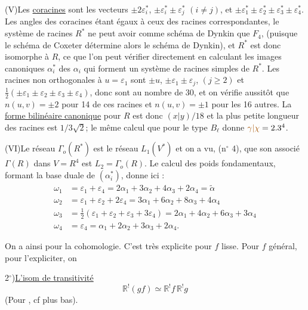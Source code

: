 (V)\quad Les \uline{coracines} sont les vecteurs $\pm2\varepsilon_i^*$, $\pm\varepsilon_i^*\pm\varepsilon_j^*$ $(i\ne j)$, et
$\pm\varepsilon_1^*\pm\varepsilon_2^*\pm\varepsilon_3^*\pm\varepsilon_4^*$. Les angles des coracines étant égaux à ceux des racines
correspondantes, le système de racines $R^*$ ne peut avoir comme schéma de Dynkin
que $F_4$, (puisque le schéma de Coxeter détermine alors le schéma de Dynkin), et $R^*$
est donc isomorphe à $R$, ce que l'on peut vérifier directement en calculant les
images canoniques $\alpha_i^*$ des $\alpha_i$ qui forment un système de racines simples de $R^*$. Les
racines non orthogonales à $u=\varepsilon_1$ sont $\pm u$, $\pm\varepsilon_1\pm\varepsilon_j$, $(j\geq2)$ et
$\frac12(\pm\varepsilon_1\pm\varepsilon_2\pm\varepsilon_3\pm\varepsilon_4)$, donc sont au nombre de 30, et on vérifie aussitôt que
$n(u,v)=\pm2$ pour 14 de ces racines et $n(u,v)=\pm1$ pour les 16 autres. La \uline{forme
bilinéaire canonique} pour $R$ est donc $(x|y)/18$ et la plus petite longueur des
racines est $1/3\sqrt2$; le même calcul que pour le type $B_\ell$ donne $\unsure{\gamma|\chi}=2.3^4$.

(VI)\quad Le réseau $\Gamma_o(R^*)$ est le réseau $L_1(V^*)$ et on a vu, (n$^\circ$ 4), que son
associé $\Gamma(R)$ dans $V=R^4$ est $L_2=\Gamma_o(R)$. Le calcul des poids fondamentaux,
formant la base duale de $(\alpha_i^*)$, donne ici :
\[
\begin{aligned}
\omega_1&=\varepsilon_1+\varepsilon_4=2\alpha_1+3\alpha_2+4\alpha_3+2\alpha_4=\widetilde{\alpha}\\
\omega_2&=\varepsilon_1+\varepsilon_2+2\varepsilon_4=3\alpha_1+6\alpha_2+8\alpha_3+4\alpha_4\\
\omega_3&=\tfrac12(\varepsilon_1+\varepsilon_2+\varepsilon_3+3\varepsilon_4)=2\alpha_1+4\alpha_2+6\alpha_3+3\alpha_4\\
\omega_4&=\varepsilon_4=\alpha_1+2\alpha_2+3\alpha_3+2\alpha_4.
\end{aligned}
\]

On a ainsi 
pour la cohomologie. C'est très explicite pour
$f$ lisse. Pour $f$ général, pour l'expliciter,
on  

2$^\circ$)\quad \uline{L'isom de transitivité}
\[
\mathbb{R}^!(gf)\simeq \mathbb{R}^!f\,\mathbb{R}^!g
\]
(Pour , cf plus bas).

